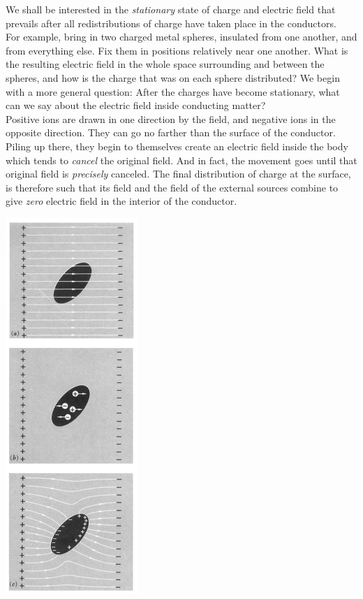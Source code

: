 \documentclass[svgnames]{article}
\begin{document}
\vspace{20px}
We shall be interested in the \textit{stationary} state of charge and electric
field that prevails after all redistributions of charge have taken place in the
conductors. \\

For example, bring in two charged metal spheres, insulated from one another,
and from everything else. Fix them in positions relatively near one another.
What is the resulting electric field in the whole space surrounding and between
the spheres, and how is the charge that was on each sphere distributed? We
begin with a more general question: After the charges have become stationary,
what can we say about the electric field inside conducting matter? \\

Positive ions are drawn in one direction by the field, and negative ions in the
opposite direction. They can go no farther than the surface of the conductor.
Piling up there, they begin to themselves create an electric field inside the
body which tends to \textit{cancel} the original field. And in fact, the
movement goes until that original field is \textit{precisely} canceled. The
final distribution of charge at the surface, is therefore such that its field
and the field of the external sources combine to give \textit{zero} electric
field in the interior of the conductor. 

\begin{center}
  \includegraphics[width = 5cm]{screenshot 6.png}
\end{center}
\end{document}

